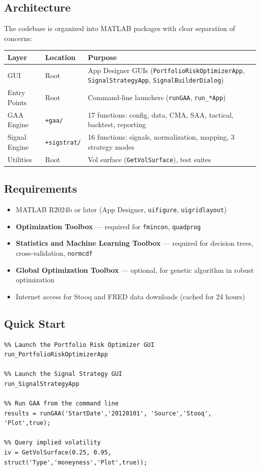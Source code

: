 \documentclass[11pt,a4paper]{article}
\begin{document}
\subsection{Architecture}
The codebase is organized into MATLAB packages with clear separation of concerns:

\begin{center}
\begin{tabularx}{\textwidth}{l l X}
\toprule
\textbf{Layer} & \textbf{Location} & \textbf{Purpose} \\
\midrule
GUI & Root & App Designer GUIs (\texttt{PortfolioRiskOptimizerApp}, \texttt{SignalStrategyApp}, \texttt{SignalBuilderDialog}) \\
Entry Points & Root & Command-line launchers (\texttt{runGAA}, \texttt{run\_*App}) \\
GAA Engine & \texttt{+gaa/} & 17 functions: config, data, CMA, SAA, tactical, backtest, reporting \\
Signal Engine & \texttt{+sigstrat/} & 16 functions: signals, normalization, mapping, 3 strategy modes \\
Utilities & Root & Vol surface (\texttt{GetVolSurface}), test suites \\
\bottomrule
\end{tabularx}
\end{center}

\subsection{Requirements}
\begin{itemize}[leftmargin=2em]
  \item MATLAB R2024b or later (App Designer, \texttt{uifigure}, \texttt{uigridlayout})
  \item \textbf{Optimization Toolbox} --- required for \texttt{fmincon}, \texttt{quadprog}
  \item \textbf{Statistics and Machine Learning Toolbox} --- required for decision trees, cross-validation, \texttt{normcdf}
  \item \textbf{Global Optimization Toolbox} --- optional, for genetic algorithm in robust optimization
  \item Internet access for Stooq and FRED data downloads (cached for 24 hours)
\end{itemize}

\subsection{Quick Start}
\begin{lstlisting}
%% Launch the Portfolio Risk Optimizer GUI
run_PortfolioRiskOptimizerApp

%% Launch the Signal Strategy GUI
run_SignalStrategyApp

%% Run GAA from the command line
results = runGAA('StartDate','20120101', 'Source','Stooq', 'Plot',true);

%% Query implied volatility
iv = GetVolSurface(0.25, 0.95, struct('Type','moneyness','Plot',true));
\end{lstlisting}
\newpage
\end{document}
